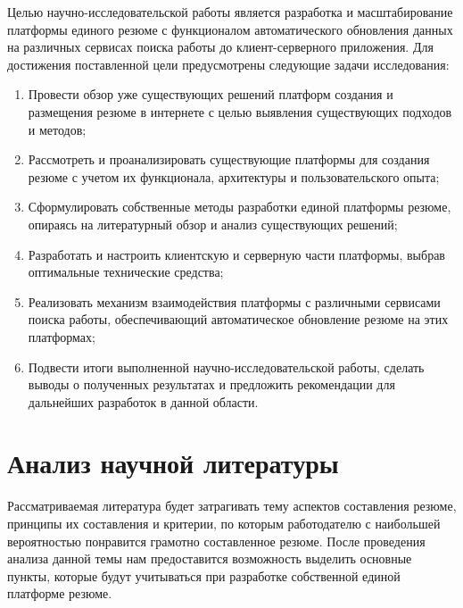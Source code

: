 \documentclass[master, och, diploma]{SCWorks}
\begin{document}
Целью научно-исследовательской работы является разработка и масштабирование платформы единого резюме с функционалом автоматического обновления данных на различных сервисах поиска работы до клиент-серверного приложения. Для достижения поставленной цели предусмотрены следующие задачи исследования:
\begin{enumerate}
    \item Провести обзор уже существующих решений платформ создания и размещения резюме в интернете с целью выявления существующих  подходов и методов;
    \item Рассмотреть и проанализировать существующие платформы для создания резюме с учетом их функционала, архитектуры и пользовательского опыта;
    \item Сформулировать собственные методы разработки единой платформы резюме, опираясь на литературный обзор и анализ существующих решений;
    \item Разработать и настроить клиентскую и серверную части платформы, выбрав оптимальные технические средства;
    \item Реализовать механизм взаимодействия платформы с различными сервисами поиска работы, обеспечивающий автоматическое обновление резюме на этих платформах;
    \item Подвести итоги выполненной научно-исследовательской работы, сделать выводы о полученных результатах и предложить рекомендации для дальнейших разработок в данной области.
\end{enumerate}






\newpage
\section{Анализ научной литературы}
Рассматриваемая литература будет затрагивать тему аспектов составления резюме, принципы их составления и критерии, по которым работодателю с наибольшей вероятностью понравится грамотно составленное резюме. После проведения анализа данной темы нам предоставится возможность выделить основные пункты, которые будут учитываться при разработке собственной единой платформе резюме.
\end{document}

